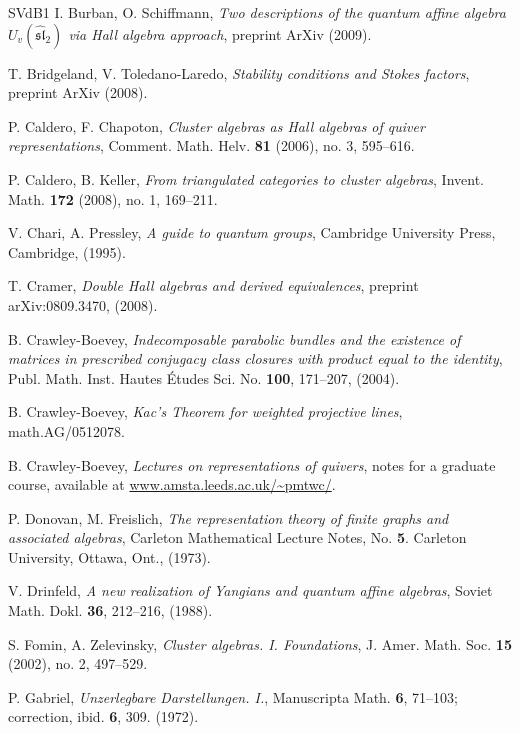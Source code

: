 \documentclass[a4paper,10pt]{amsart}
\numberwithin{equation}{section}
\begin{document}
{{\begin{thebibliography}{SVdB1}
I. Burban, O. Schiffmann, \emph{Two descriptions of the quantum affine algebra $U_v(\widehat{\mathfrak{sl}}_2)$ via Hall algebra approach}, preprint ArXiv (2009).

T. Bridgeland, V. Toledano-Laredo, \emph{Stability conditions and Stokes factors}, preprint ArXiv (2008).

P. Caldero, F. Chapoton, \emph{Cluster algebras as Hall algebras of quiver representations}, Comment. Math. Helv. \textbf{81} (2006), no. 3, 595--616.

P. Caldero, B. Keller, \emph{From triangulated categories to cluster algebras}, Invent. Math. \textbf{172} (2008), no. 1, 169--211.

V. Chari, A. Pressley, \emph{A guide to quantum groups}, Cambridge University Press, Cambridge, (1995).

T. Cramer, \emph{Double Hall algebras and derived equivalences}, preprint  arXiv:0809.3470, (2008).

B. Crawley-Boevey, \emph{Indecomposable parabolic bundles and the existence of matrices in prescribed conjugacy class closures with product equal to the identity}, Publ. Math. Inst. Hautes \'Etudes Sci. No. \textbf{100}, 171--207, (2004).

B. Crawley-Boevey, \emph{Kac's Theorem for weighted projective lines}, math.AG/0512078.

B. Crawley-Boevey, \emph{Lectures on representations of quivers}, notes for a graduate course, available at \url{www.amsta.leeds.ac.uk/~pmtwc/}.

P. Donovan, M. Freislich, \emph{The representation theory of finite graphs and associated algebras},
Carleton Mathematical Lecture Notes, No. \textbf{5}. Carleton University, Ottawa, Ont., (1973).

V. Drinfeld, \emph{A new realization of Yangians and quantum affine algebras}, Soviet Math. Dokl. \textbf{36}, 212--216, (1988).

S. Fomin, A. Zelevinsky, \emph{Cluster algebras. I. Foundations}, J. Amer. Math. Soc. \textbf{15} (2002), no. 2, 497--529.

P. Gabriel, \emph{Unzerlegbare Darstellungen. I.},
Manuscripta Math. \textbf{6}, 71--103; correction, ibid. \textbf{6}, 309. (1972).


\end{thebibliography}}}
\end{document}
